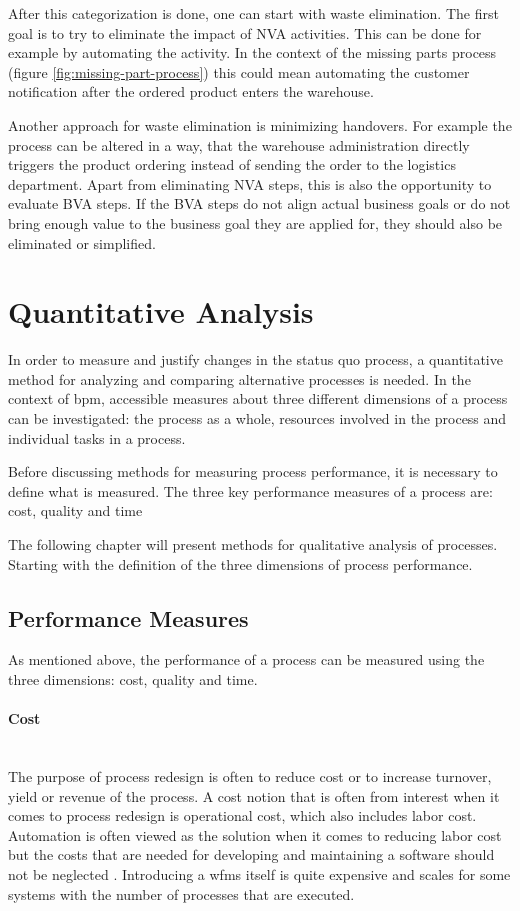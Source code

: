 After this categorization is done, one can start with waste elimination. The first goal is to try to eliminate the impact of NVA activities. This can be done for example by automating the activity. In the context of the missing parts process (figure \ref{fig:missing-part-process}) this could mean automating the customer notification after the ordered product enters the warehouse. 

Another approach for waste elimination is minimizing handovers. For example the process can be altered in a way, that the warehouse administration directly triggers the product ordering instead of sending the order to the logistics department. Apart from eliminating NVA steps, this is also the opportunity to evaluate BVA steps. If the BVA steps do not align actual business goals or do not bring enough value to the business goal they are applied for, they should also be eliminated or simplified. \cite{fundamentals}\cite{harrington2016value}

\section{Quantitative Analysis}\label{quant}
In order to measure and justify changes in the status quo process, a quantitative method for analyzing and comparing alternative processes is needed. In the context of \gls{bpm}, accessible measures about three different dimensions of a process can be investigated: the process as a whole, resources involved in the process and individual tasks in a process. \cite{fundamentals}

Before discussing methods for measuring process performance, it is necessary to define what is measured. The three key performance measures of a process are: cost, quality and time\cite{fundamentals}

The following chapter will present methods for qualitative analysis of processes. Starting with the definition of the three dimensions of process performance. 

\subsection{Performance Measures}
As mentioned above, the performance of a process can be measured using the three dimensions:  cost, quality and  time. 
\paragraph{Cost}~\\
The purpose of process redesign is often to reduce cost or to increase turnover, yield or revenue of the process. A cost notion that is often from interest when it comes to process redesign is operational cost, which also includes labor cost. Automation is often viewed as the solution when it comes to reducing labor cost but the costs that are needed for developing and maintaining a software should not be neglected \cite{fundamentals}. Introducing a \gls{wfms} itself is quite expensive and scales for some systems with the number of processes that are executed.
 
